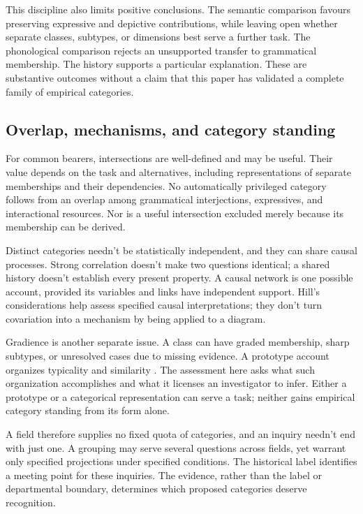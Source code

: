 This discipline also limits positive conclusions. The semantic comparison
favours preserving expressive and depictive contributions, while leaving
open whether separate classes, subtypes, or dimensions best serve a
further task. The phonological comparison rejects an unsupported transfer
to grammatical membership. The  history supports a particular
explanation. These are substantive outcomes without a claim that this
paper has validated a complete family of empirical categories.

\subsection{Overlap, mechanisms, and category standing}

For common bearers, intersections are well-defined and may be useful.
Their value depends on the task and alternatives, including representations
of separate memberships and their dependencies. No automatically privileged
category follows from an overlap among grammatical interjections,
expressives, and interactional resources. Nor is a useful intersection
excluded merely because its membership can be derived.

Distinct categories needn't be statistically independent, and they can
share causal processes. Strong correlation doesn't make two questions
identical; a shared history doesn't establish every present property.
A causal network is one possible account, provided its variables and
links have independent support. Hill's considerations help assess
specified causal interpretations; they don't turn covariation into
a mechanism by being applied to a diagram.

Gradience is another separate issue. A class can have graded membership,
sharp subtypes, or unresolved cases due to missing evidence. A prototype
account organizes typicality and similarity \citep{rosch1975,taylor2003}.
The assessment here asks what such organization accomplishes and what
it licenses an investigator to infer. Either a prototype or a categorical
representation can serve a task; neither gains empirical category standing
from its form alone.

A field therefore supplies no fixed quota of categories, and an inquiry
needn't end with just one. A grouping may serve several questions across
fields, yet warrant only specified projections under specified conditions.
The historical label  identifies a meeting point for
these inquiries. The evidence, rather than the label or departmental
boundary, determines which proposed categories deserve recognition.

